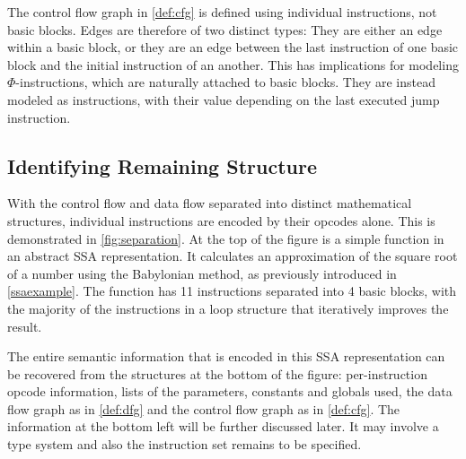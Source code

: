     The control flow graph in \autoref{def:cfg} is defined using individual
    instructions, not basic blocks.
    Edges are therefore of two distinct types:
    They are either an edge within a basic block, or they are an edge between
    the last instruction of one basic block and the initial instruction of an
    another.
    This has implications for modeling $\Phi$-instructions, which are naturally
    attached to basic blocks.
    They are instead modeled as instructions, with their value depending on the
    last executed jump instruction.

\subsection{Identifying Remaining Structure}

    With the control flow and data flow separated into distinct mathematical
    structures, individual instructions are encoded by their opcodes alone.
    This is demonstrated in \autoref{fig:separation}.
    At the top of the figure is a simple function in an abstract SSA
    representation.
    It calculates an approximation of the square root of a number using the
    Babylonian method, as previously introduced in \autoref{ssaexample}.
    The function has 11 instructions separated into 4 basic blocks, with the
    majority of the instructions in a loop structure that iteratively improves
    the result.

    The entire semantic information that is encoded in this SSA representation
    can be recovered from the structures at the bottom of the figure:
    per-instruction opcode information, lists of the parameters, constants and
    globals used, the data flow graph as in \autoref{def:dfg} and the control
    flow graph as in \autoref{def:cfg}.
    The information at the bottom left will be further discussed later.
    It may involve a type system and also the instruction set remains to be
    specified.


